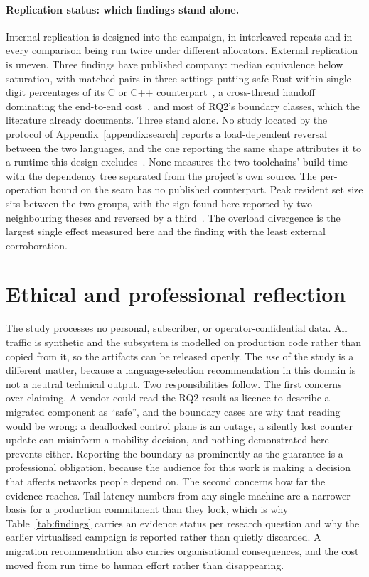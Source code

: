 \paragraph{Replication status: which findings stand alone.}
Internal replication is designed into the campaign, in \NRepeats{} interleaved repeats and in
every comparison being run twice under different allocators. External replication is uneven. Three
findings have published company: median equivalence below saturation, with matched pairs in three
settings putting safe Rust within single-digit percentages of its C or C++
counterpart~\cite{emmerich2019drivers,li2021ipc,gonzalez2023rustudp}, a cross-thread handoff
dominating the end-to-end cost~\cite{zhou2025oltp}, and most of RQ2's boundary classes, which the
literature already documents. Three stand alone. No study located by the protocol of
Appendix~\ref{appendix:search} reports a load-dependent reversal between the two languages, and the
one reporting the same shape attributes it to a runtime this design
excludes~\cite{arvidsson2025async}. None measures the two toolchains' build time with the
dependency tree separated from the project's own source. The per-operation bound on the seam has
no published counterpart. Peak resident set size sits between the two groups, with the sign found
here reported by two neighbouring theses and reversed by a
third~\cite{olsson2023ranmgmt,sundvisson2026drivers,karlback2021ran}. The overload divergence is
the largest single effect measured here and the finding with the least external corroboration.

\section{Ethical and professional reflection}
The study processes no personal, subscriber, or operator-confidential data. All traffic is
synthetic and the subsystem is modelled on production code rather than copied from it, so the
artifacts can be released openly. The \emph{use} of the study is a different matter, because a
language-selection recommendation in this domain is not a neutral technical output. Two
responsibilities follow. The first concerns over-claiming. A vendor could read the RQ2 result as
licence to describe a migrated component as ``safe'', and the boundary cases are why that reading
would be wrong: a deadlocked control plane is an outage, a silently lost counter update can
misinform a mobility decision, and nothing demonstrated here prevents either. Reporting the
boundary as prominently as the guarantee is a professional obligation, because the audience for
this work is making a decision that affects networks people depend on. The second concerns how far
the evidence reaches. Tail-latency numbers from any single machine are a narrower basis for a
production commitment than they look, which is why Table~\ref{tab:findings} carries an evidence
status per research question and why the earlier virtualised campaign is reported rather than
quietly discarded. A migration recommendation also carries organisational consequences, and the
cost moved from run time to human effort rather than disappearing.

